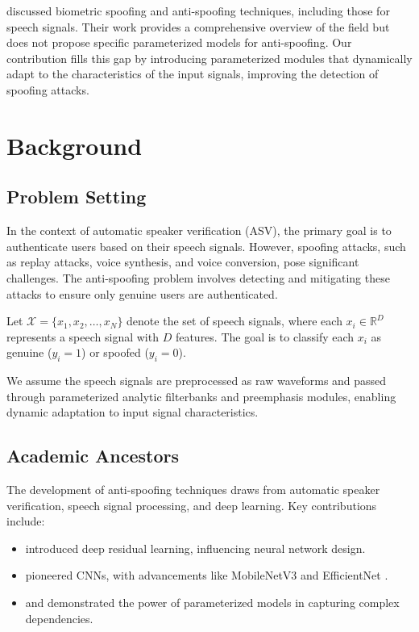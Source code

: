 \documentclass{article} %
\begin{document}
\citet{Akhtar2017BiometricSA} discussed biometric spoofing and anti-spoofing techniques, including those for speech signals. Their work provides a comprehensive overview of the field but does not propose specific parameterized models for anti-spoofing. Our contribution fills this gap by introducing parameterized modules that dynamically adapt to the characteristics of the input signals, improving the detection of spoofing attacks.

\section{Background}
\label{sec:background}
\subsection{Problem Setting}
\label{subsec:problem_setting}
In the context of automatic speaker verification (ASV), the primary goal is to authenticate users based on their speech signals. However, spoofing attacks, such as replay attacks, voice synthesis, and voice conversion, pose significant challenges. The anti-spoofing problem involves detecting and mitigating these attacks to ensure only genuine users are authenticated.

Let $\mathcal{X} = \{x_1, x_2, \dots, x_N\}$ denote the set of speech signals, where each $x_i \in \mathbb{R}^D$ represents a speech signal with $D$ features. The goal is to classify each $x_i$ as genuine ($y_i = 1$) or spoofed ($y_i = 0$).

We assume the speech signals are preprocessed as raw waveforms and passed through parameterized analytic filterbanks and preemphasis modules, enabling dynamic adaptation to input signal characteristics.

\subsection{Academic Ancestors}
\label{subsec:academic_ancestors}
The development of anti-spoofing techniques draws from automatic speaker verification, speech signal processing, and deep learning. Key contributions include:
\begin{itemize}
    \item \citet{he2016deep} introduced deep residual learning, influencing neural network design.
    \item \citet{simonyan2014very} pioneered CNNs, with advancements like MobileNetV3 \citep{howard2019mobilenetv3} and EfficientNet \citep{tan2019efficientnet}.
    \item \citet{vaswani2017attention} and \citet{dosovitskiy2020image} demonstrated the power of parameterized models in capturing complex dependencies.
\end{itemize}
\end{document}
